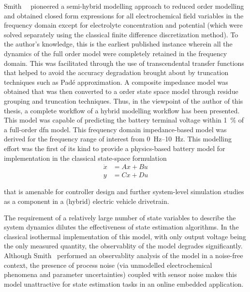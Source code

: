 Smith~\etal{}~\cite{Smith2007}  pioneered   a  semi-hybrid   modelling  approach
to  reduced  order  modelling  and  obtained closed  form  expressions  for  all
electrochemical field variables  in the frequency domain  except for electrolyte
concentration and  potential (which were  solved separately using  the classical
finite difference discretization method). To the author's knowledge, this is the
earliest  published  instance  wherein  all  the  dynamics  of  the  full  order
model were  completely retained  in the frequency  domain. This  was facilitated
through the  use of transcendental transfer  functions that helped to  avoid the
accuracy  degradation  brought about  by  truncation  techniques such  as  Padé
approximation. A composite impedance model  was obtained that was then converted
to  a   order state  space model  through residue  grouping and
truncation techniques.  Thus, in the viewpoint  of the author of  this thesis, a
complete workflow of a hybrid modelling  workflow has been presented. This model
was capable of  predicting the battery terminal  voltage within \SI{1}{\percent}
of a full-order \gls{dfn} model. This frequency domain impedance-based model was
derived for the  frequency range of interest  from \SIrange{0}{10}{\hertz}. This
modelling effort  was the first of  its kind to provide  a physics-based battery
model for implementation in the classical state-space formulation
\begin{equation}\label{eq:statespace}
    \begin{aligned}
        \dot{x} &= Ax + Bu \\
        y &= Cx + Du
    \end{aligned}
\end{equation}

that  is amenable  for  controller design  and  further system-level  simulation
studies \eg{} as a component in a (hybrid) electric vehicle drivetrain.

The requirement of a relatively large  number of state variables to describe the
system dynamics dilutes the effectiveness of state estimation algorithms. In the
classical  isothermal implementation  of this  model, with  only output  voltage
being  the  only measured  quantity,  the  observablity  of the  model  degrades
significantly. Although Smith~\etal{} performed  an observablity analysis of the
model in  a noise-free context,  the presence  of process noise  (via unmodelled
electrochemical phenomena and parameter uncertainties) coupled with sensor noise
makes this model  unattractive for state estimation tasks in  an online embedded
application.

